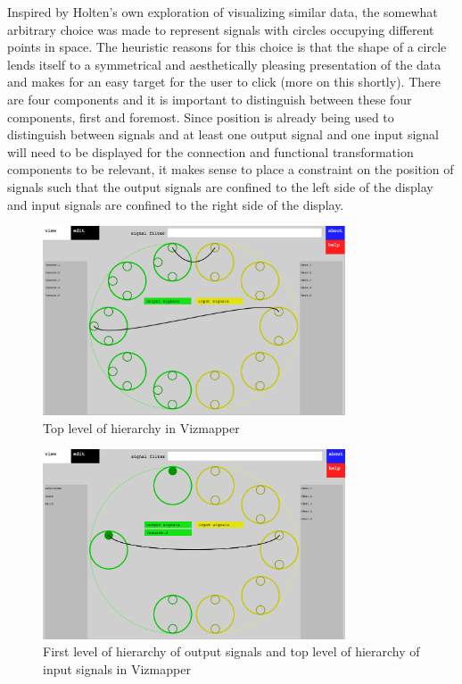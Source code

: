 Inspired by Holten's own exploration of visualizing similar data, the somewhat arbitrary choice was made to represent signals with circles occupying different points in space. The heuristic reasons for this choice is that the shape of a circle lends itself to a symmetrical and aesthetically pleasing presentation of the data and makes for an easy target for the user to click (more on this shortly). There are four components and it is important to distinguish between these four components, first and foremost. Since position is already being used to distinguish between signals and at least one output signal and one input signal will need to be displayed for the connection and functional transformation components to be relevant, it makes sense to place a constraint on the position of signals such that the output signals are confined to the left side of the display and input signals are confined to the right side of the display.

\begin{figure}[ht]
\centering
\includegraphics[width=0.8\textwidth]{root_level.png}
\caption{Top level of hierarchy in Vizmapper}
\label{fig:rootLevel}
\end{figure}

\begin{figure}[ht]
\centering
\includegraphics[width=0.8\textwidth]{left_first_level.png}
\caption{First level of hierarchy of output signals and top level of hierarchy of input signals in Vizmapper}
\label{fig:firstLevel}
\end{figure}

